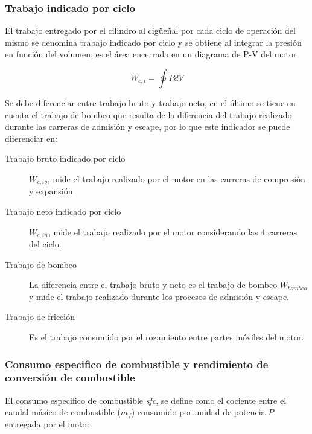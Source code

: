 
\subsubsection{Trabajo indicado por ciclo}
%
El trabajo entregado por el cilindro al cigüeñal por cada ciclo de operación del
mismo se denomina trabajo indicado por ciclo y se obtiene al integrar la presión
en función del volumen, es el área encerrada en un diagrama de P-V del motor.

\begin{equation}\label{eq:w_indicado} W_{c,i} = \oint P dV
\end{equation}

Se debe diferenciar entre trabajo bruto y trabajo neto, en el último se tiene en
cuenta el trabajo de bombeo que resulta de la diferencia del trabajo realizado
durante las carreras de admisión y escape, por lo que este indicador se puede
diferenciar en:
%
\begin{description}
  \item [Trabajo bruto indicado por ciclo] $W_{c,ig}$, mide el trabajo realizado
por el motor en las carreras de compresión y expansión.
  \item [Trabajo neto indicado por ciclo] $W_{c,in}$, mide el trabajo realizado
por el motor considerando las 4 carreras del ciclo.
  \item [Trabajo de bombeo] La diferencia entre el trabajo bruto y neto es el
trabajo de bombeo $W_{bombeo}$ y mide el trabajo realizado durante los procesos
de admisión y escape.
  \item [Trabajo de fricción] Es el trabajo consumido por el rozamiento entre
partes móviles del motor.
\end{description}





\subsubsection{Consumo especifico de combustible y rendimiento de conversión de
combustible}
%
El consumo especifico de combustible \emph{sfc}, se define como el cociente
entre el caudal másico de combustible ($\dot{m_f}$) consumido por unidad de
potencia $P$ entregada por el motor.

